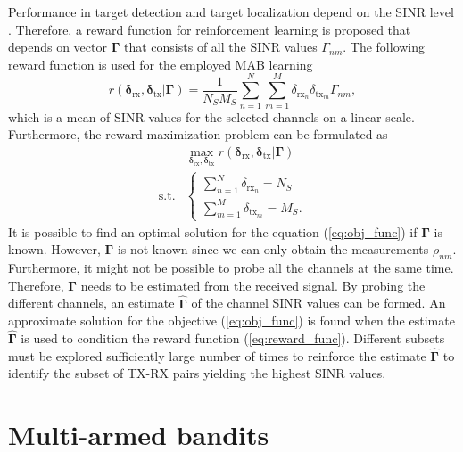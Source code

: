 \documentclass[conference]{IEEEtran}
\newcommand{\esinrexp}{\Gamma_{nm}}
\newcommand{\vsinrexp}{\boldsymbol{\Gamma}}
\newcommand{\vsinrb}{\widehat{\boldsymbol{\Gamma}}}
\newcommand{\easvtx}{\delta_{\text{tx}_m}}
\newcommand{\vasvtx}{\boldsymbol{\delta}_{\text{tx}}}
\newcommand{\easvrx}{\delta_{\text{rx}_n}}
\newcommand{\vasvrx}{\boldsymbol{\delta}_{\text{rx}}}
\newcommand{\esp}{\rho_{nm}}
\begin{document}
Performance in target detection and target localization depend on the SINR level \cite{aittomaki1, aittomaki2, antenna_subset_selection, selection_and_placement}.
Therefore, a reward function for reinforcement learning is proposed that depends on vector $\vsinrexp$ that consists of all the SINR values $\esinrexp$.
The following reward function is used for the employed MAB learning
\begin{equation}\label{eq:reward_func}
    r(\vasvrx, \vasvtx | \vsinrexp) = \frac{1}{N_S M_S}\sum_{n=1}^N \sum_{m=1}^M  \easvrx \easvtx \esinrexp,
\end{equation}
which is a mean of SINR values for the selected channels on a linear scale.
Furthermore, the reward maximization problem can be formulated as
\begin{equation}\label{eq:obj_func}
    \begin{array}{ll}
                &   \max_{\vasvrx, \vasvtx} r(\vasvrx, \vasvtx | \vsinrexp) \\[7pt]
    \text{s.t.} &   
                \left\{\begin{array}{l}
                    \sum_{n=1}^N \easvrx = N_S \\
                    \sum_{m=1}^M \easvtx = M_S.
                \end{array}\right.
    \end{array}
\end{equation}
It is possible to find an optimal solution for the equation (\ref{eq:obj_func}) if $\vsinrexp$ is known.
However, $\vsinrexp$ is not known since we can only obtain the measurements $\esp$. 
Furthermore, it might not be possible to probe all the channels at the same time.
Therefore, $\vsinrexp$ needs to be estimated from the received signal. 
By probing the different channels, an estimate $\vsinrb$ of the channel SINR values can be formed.
An approximate solution for the objective (\ref{eq:obj_func}) is found when the estimate $\vsinrb$ is used to condition the reward function (\ref{eq:reward_func}).
Different subsets must be explored sufficiently large number of times to reinforce the estimate $\vsinrb$ to identify the subset of TX-RX pairs yielding the highest SINR values.

\section{Multi-armed bandits}
\label{sec:mab}
\end{document}
